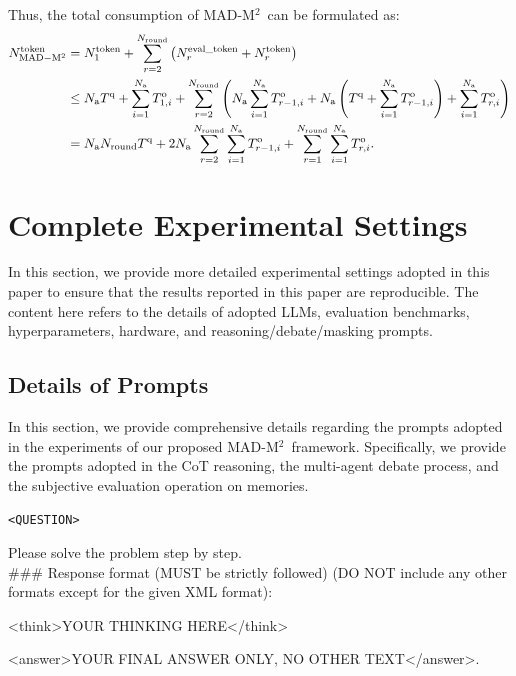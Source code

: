 \documentclass{article} %
\newcommand{\methodname}{MAD-M$^2$}
\newcommand{\uprmvar}[2]{#1^{\rm #2}}
\theoremstyle{plain}
\begin{document}
Thus, the total consumption of \methodname\ can be formulated as:
\[
    \begin{aligned}
    \uprmvar{N}{token}_{\rm MAD-M^2} &= \uprmvar{N}{token}_1+\sum_{r=2}^{N_{\rm round}}\left(\uprmvar{N}{eval\_token}_{r}+\uprmvar{N}{token}_r\right)\\
    &\leq N_{\rm a}\uprmvar{T}{q} + \sum_{i=1}^{N_{\rm a}}\uprmvar{T}{o}_{1, i} + \sum_{r=2}^{N_{\rm round}}\left(N_{\rm a}\sum_{i=1}^{N_{\rm a}}\uprmvar{T}{o}_{r-1, i}+N_{\rm a}\left(\uprmvar{T}{q}+\sum_{i=1}^{N_{\rm a}}\uprmvar{T}{o}_{r-1, i}\right)+\sum_{i=1}^{N_{\rm a}}\uprmvar{T}{o}_{r, i}\right)\\
    &=N_{\rm a}N_{\rm round}\uprmvar{T}{q}  +  2N_{\rm a}\sum_{r=2}^{N_{\rm round}}\sum_{i=1}^{N_{\rm a}}\uprmvar{T}{o}_{r-1, i}+\sum_{r=1}^{N_{\rm round}}\sum_{i=1}^{N_{\rm a}}\uprmvar{T}{o}_{r, i}.
\end{aligned}
\]

\clearpage
\section{Complete Experimental Settings}
\label{appendix:complete_exp_settings}
In this section, we provide more detailed experimental settings adopted in this paper to ensure that the results reported in this paper are reproducible. The content here refers to the details of adopted LLMs, evaluation benchmarks, hyperparameters, hardware, and reasoning/debate/masking prompts.

\vspace{-8pt}
\subsection{Details of Prompts}
\vspace{-4pt}
In this section, we provide comprehensive details regarding the prompts adopted in the experiments of our proposed \methodname\ framework. Specifically, we provide the prompts adopted in the CoT reasoning, the multi-agent debate process, and the subjective evaluation operation on memories.

\begin{tcolorbox}[breakable,
  colback=gray!20!white,
  colframe=gray!80!black,
  title=CoT Prompt,
  fonttitle=\bfseries
]
\texttt{<QUESTION>}

Please solve the problem step by step. \\

\#\#\# Response format (MUST be strictly followed) (DO NOT include any other formats except for the given XML format): 

<think>YOUR THINKING HERE</think>

<answer>YOUR FINAL ANSWER ONLY, NO OTHER TEXT</answer>.
\end{tcolorbox}
\end{document}

